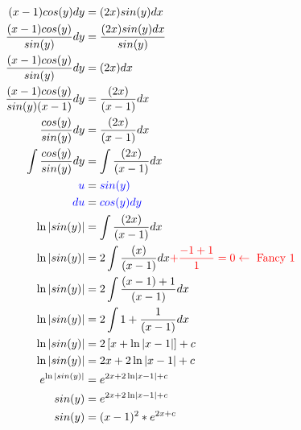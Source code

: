 \begin{ex}
\begin{align*}
    (x-1)cos(y) dy &= (2x)sin(y) dx\\
    \frac{(x-1)cos(y)}{sin(y)} dy &= \frac{(2x)sin(y) dx}{sin(y)}\\
    \frac{(x-1)cos(y)}{sin(y)} dy &= (2x)dx\\
    \frac{(x-1)cos(y)}{sin(y)(x-1)} dy &= \frac{(2x)}{(x-1)}dx\\
    \frac{cos(y)}{sin(y)} dy &= \frac{(2x)}{(x-1)}dx\\
    \int \frac{cos(y)}{sin(y)} dy &= \int \frac{(2x)}{(x-1)}dx\\
    \textcolor{blue}{u} &= \textcolor{blue}{sin(y)}\\
    \textcolor{blue}{du} &= \textcolor{blue}{cos(y)dy}\\
    \ln |sin(y)| &= \int \frac{(2x)}{(x-1)}dx\\
    \ln |sin(y)| &= 2\int \frac{(x)}{(x-1)}dx  \textcolor{red}{ +\frac{-1+1}{1}=0 \leftarrow \text{ Fancy 1}}\\
    \ln |sin(y)| &= 2\int \frac{(x-1)+1}{(x-1)}dx\\
    \ln |sin(y)| &= 2\int 1+ \frac{1}{(x-1)}dx\\
    \ln |sin(y)| &= 2 \left[ x +\ln \left| x-1 \right| \right]+c\\
    \ln |sin(y)| &= 2x +2 \ln \left| x-1 \right| +c\\
    e^{\ln |sin(y)|} &= e^{2x +2 \ln \left| x-1 \right| +c}\\
    sin(y) &= e^{2x +2 \ln \left| x-1 \right| +c}\\
    sin(y) &= (x-1)^2*e^{2x+c}\\
\end{align*}
\end{ex}
